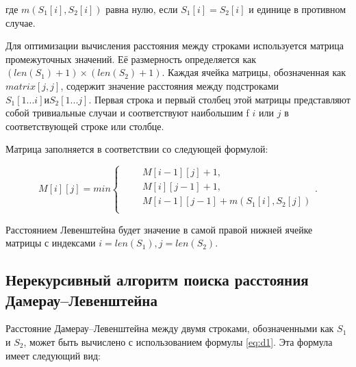 где $m(S_{1}[i], S_{2}[i])$ равна нулю, если $S_{1}[i] = S_{2}[i]$ и единице в противном случае.

Для оптимизации вычисления расстояния между строками используется матрица промежуточных значений. Её размерность определяется как $(len(S_{1}) + 1) × (len(S_{2}) + 1)$.
Каждая ячейка матрицы, обозначенная как $matrix[j, j]$, содержит значение расстояния между подстроками $S_{1}[1...i] и S_{2}[1...j]$. 
Первая строка и первый столбец этой матрицы представляют собой тривиальные случаи и соответствуют наибольшим f $i$ или $j$ в соответствующей строке или столбце.

Матрица заполняется в соответствии со следующей формулой:

\begin{equation}
	\label{eq:mat}
	M[i][j] = min \begin{cases}
		\qquad M[i-1][j] + 1,\\
		\qquad M[i][j-1] + 1,\\
		\qquad M[i-1][j-1] + m(S_{1}[i], S_{2}[j])\\
	\end{cases}.
\end{equation}

Расстоянием Левенштейна будет значение в самой правой нижней ячейке матрицы с индексами $i = len(S_{1}), j = len(S_{2})$.

\subsection{Нерекурсивный алгоритм поиска расстояния Дамерау--Левенштейна}

Расстояние Дамерау--Левенштейна между двумя строками, обозначенными как $S_1$ и $S_2$, может быть вычислено с использованием формулы \ref{eq:d1}. 
Эта формула имеет следующий вид:

